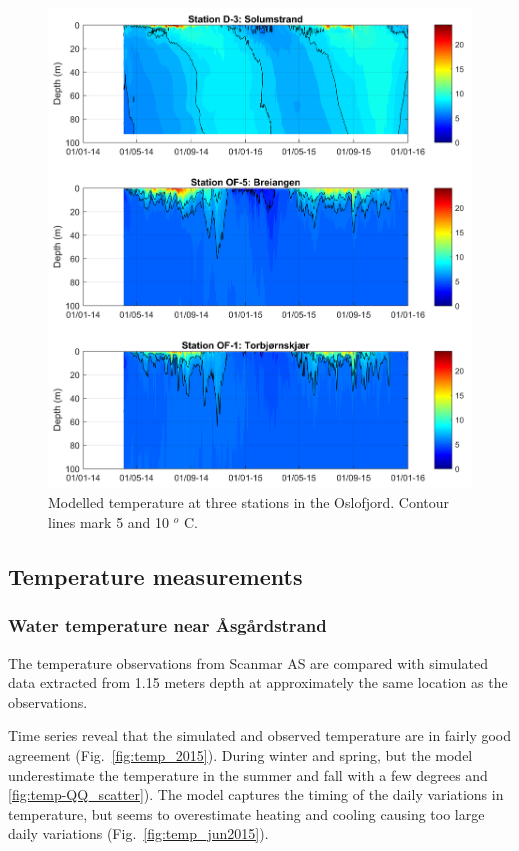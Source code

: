 \begin{figure}[tbh]
\centerline{
\includegraphics*[trim=0cm 0cm 0cm 0cm,clip=true,width=\textwidth]{Figurer/Temp_Mod_2014_2015}}
\caption{\small
Modelled temperature at three stations in the Oslofjord. Contour lines mark 5 and 10 $^o$ C.
}
\label{fig:Temp_Mod_2014_2015}
\end{figure}

\clearpage
\subsection{Temperature measurements}
\label{subsec:tempee}
\subsubsection{Water temperature near \AA sg\aa rdstrand}

The temperature observations from Scanmar AS are compared with simulated data extracted from 1.15 meters depth at approximately the same location as the observations.

Time series reveal that the simulated and observed temperature are in fairly good agreement (Fig.~\ref{fig:temp_2015}). During winter and spring, but the model underestimate the temperature in the summer and fall with a few degrees  and \ref{fig:temp-QQ_scatter}). The model captures the timing of the daily variations in temperature, but seems to overestimate heating and cooling causing too large daily variations (Fig.~\ref{fig:temp_jun2015}). 

